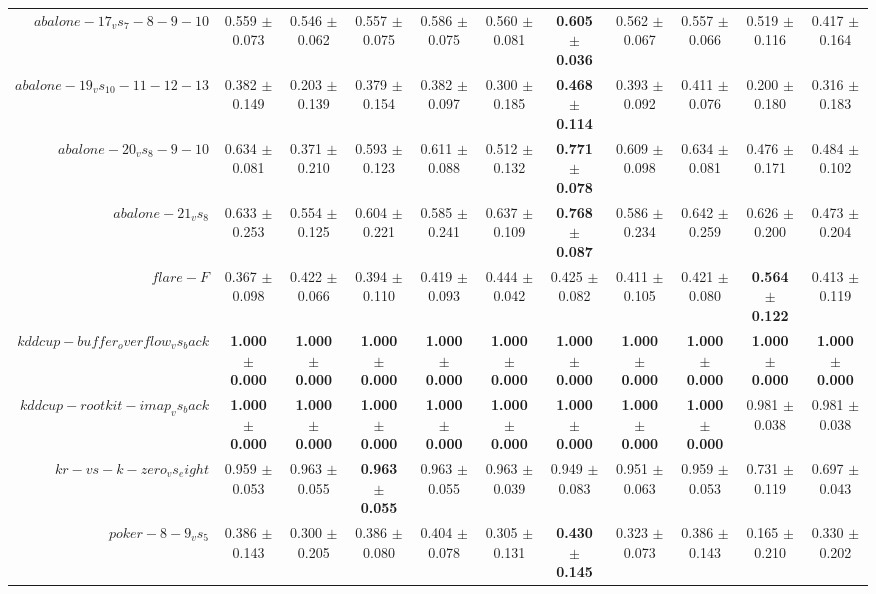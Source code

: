 \begin{table}[!ht]
{\begin{tabular}{r c c c c c c c c c c}
$abalone-17_vs_7-8-9-10$ & 0.559 $\pm$ 0.073 & 0.546 $\pm$ 0.062 & 0.557 $\pm$ 0.075 & 0.586 $\pm$ 0.075 & 0.560 $\pm$ 0.081 & \textbf{0.605 $\pm$ 0.036} & 0.562 $\pm$ 0.067 & 0.557 $\pm$ 0.066 & 0.519 $\pm$ 0.116 & 0.417 $\pm$ 0.164 \\
$abalone-19_vs_10-11-12-13$ & 0.382 $\pm$ 0.149 & 0.203 $\pm$ 0.139 & 0.379 $\pm$ 0.154 & 0.382 $\pm$ 0.097 & 0.300 $\pm$ 0.185 & \textbf{0.468 $\pm$ 0.114} & 0.393 $\pm$ 0.092 & 0.411 $\pm$ 0.076 & 0.200 $\pm$ 0.180 & 0.316 $\pm$ 0.183 \\
$abalone-20_vs_8-9-10$ & 0.634 $\pm$ 0.081 & 0.371 $\pm$ 0.210 & 0.593 $\pm$ 0.123 & 0.611 $\pm$ 0.088 & 0.512 $\pm$ 0.132 & \textbf{0.771 $\pm$ 0.078} & 0.609 $\pm$ 0.098 & 0.634 $\pm$ 0.081 & 0.476 $\pm$ 0.171 & 0.484 $\pm$ 0.102 \\
$abalone-21_vs_8$ & 0.633 $\pm$ 0.253 & 0.554 $\pm$ 0.125 & 0.604 $\pm$ 0.221 & 0.585 $\pm$ 0.241 & 0.637 $\pm$ 0.109 & \textbf{0.768 $\pm$ 0.087} & 0.586 $\pm$ 0.234 & 0.642 $\pm$ 0.259 & 0.626 $\pm$ 0.200 & 0.473 $\pm$ 0.204 \\
$flare-F$ & 0.367 $\pm$ 0.098 & 0.422 $\pm$ 0.066 & 0.394 $\pm$ 0.110 & 0.419 $\pm$ 0.093 & 0.444 $\pm$ 0.042 & 0.425 $\pm$ 0.082 & 0.411 $\pm$ 0.105 & 0.421 $\pm$ 0.080 & \textbf{0.564 $\pm$ 0.122} & 0.413 $\pm$ 0.119 \\
$kddcup-buffer_overflow_vs_back$ & \textbf{1.000 $\pm$ 0.000} & \textbf{1.000 $\pm$ 0.000} & \textbf{1.000 $\pm$ 0.000} & \textbf{1.000 $\pm$ 0.000} & \textbf{1.000 $\pm$ 0.000} & \textbf{1.000 $\pm$ 0.000} & \textbf{1.000 $\pm$ 0.000} & \textbf{1.000 $\pm$ 0.000} & \textbf{1.000 $\pm$ 0.000} & \textbf{1.000 $\pm$ 0.000} \\
$kddcup-rootkit-imap_vs_back$ & \textbf{1.000 $\pm$ 0.000} & \textbf{1.000 $\pm$ 0.000} & \textbf{1.000 $\pm$ 0.000} & \textbf{1.000 $\pm$ 0.000} & \textbf{1.000 $\pm$ 0.000} & \textbf{1.000 $\pm$ 0.000} & \textbf{1.000 $\pm$ 0.000} & \textbf{1.000 $\pm$ 0.000} & 0.981 $\pm$ 0.038 & 0.981 $\pm$ 0.038 \\
$kr-vs-k-zero_vs_eight$ & 0.959 $\pm$ 0.053 & 0.963 $\pm$ 0.055 & \textbf{0.963 $\pm$ 0.055} & 0.963 $\pm$ 0.055 & 0.963 $\pm$ 0.039 & 0.949 $\pm$ 0.083 & 0.951 $\pm$ 0.063 & 0.959 $\pm$ 0.053 & 0.731 $\pm$ 0.119 & 0.697 $\pm$ 0.043 \\
$poker-8-9_vs_5$ & 0.386 $\pm$ 0.143 & 0.300 $\pm$ 0.205 & 0.386 $\pm$ 0.080 & 0.404 $\pm$ 0.078 & 0.305 $\pm$ 0.131 & \textbf{0.430 $\pm$ 0.145} & 0.323 $\pm$ 0.073 & 0.386 $\pm$ 0.143 & 0.165 $\pm$ 0.210 & 0.330 $\pm$ 0.202 \\

\end{tabular}}
\end{table}
